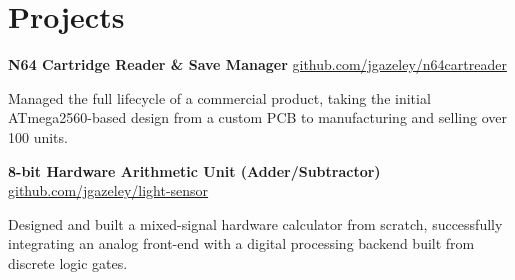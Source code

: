 \section{Projects}
\vspace{0.1cm}
\noindent 
\textbf{N64 Cartridge Reader \& Save Manager} \quad \href{https://github.com/jgazeley/n64cartreader}{\faGithub \: github.com/jgazeley/n64cartreader}
\begin{highlightsforbulletentries}
    \item Managed the full lifecycle of a commercial product, taking the initial ATmega2560-based design from a custom PCB to manufacturing and selling over 100 units.
\end{highlightsforbulletentries}

\vspace{0.2cm}
\noindent
\textbf{8-bit Hardware Arithmetic Unit (Adder/Subtractor)} \quad \href{https://github.com/jgazeley/light-sensor}{\faGithub \: github.com/jgazeley/light-sensor}
\begin{highlightsforbulletentries}
    \item Designed and built a mixed-signal hardware calculator from scratch, successfully integrating an analog front-end %
    with a digital processing backend built from discrete %
    logic gates.
\end{highlightsforbulletentries}


